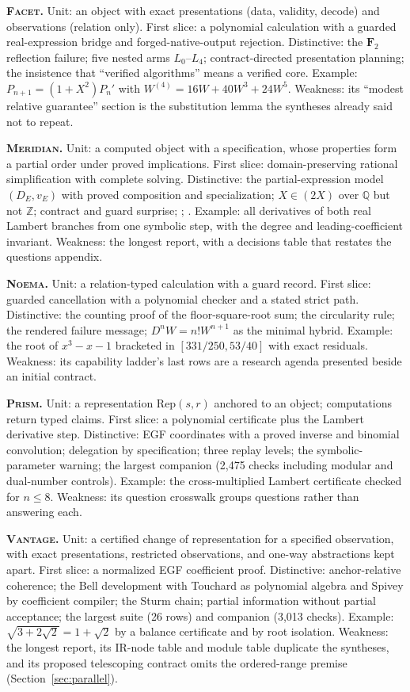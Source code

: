 \documentclass[11pt,a4paper]{article}
\newcommand{\code}[1]{\texttt{\detokenize{#1}}}
\newcommand{\Fc}{\textsc{Facet}}
\newcommand{\Md}{\textsc{Meridian}}
\newcommand{\Nm}{\textsc{Noema}}
\newcommand{\Pm}{\textsc{Prism}}
\newcommand{\Vt}{\textsc{Vantage}}
\newcommand{\Z}{\mathbb Z}
\newcommand{\Q}{\mathbb Q}
\theoremstyle{definition}
\begin{document}
\textbf{\Fc.} Unit: an object with exact presentations (data, validity, decode) and observations (relation only). First slice: a polynomial calculation with a guarded real-expression bridge and forged-native-output rejection. Distinctive: the $\mathbf F_2$ reflection failure; five nested arms $L_0$--$L_4$; contract-directed presentation planning; the insistence that ``verified algorithms'' means a verified core. Example: $P_{n+1}=(1+X^2)P_n'$ with $W^{(4)}=16W+40W^3+24W^5$. Weakness: its ``modest relative guarantee'' section is the substitution lemma the syntheses already said not to repeat.

\textbf{\Md.} Unit: a computed object with a specification, whose properties form a partial order under proved implications. First slice: domain-preserving rational simplification with complete solving. Distinctive: the partial-expression model $(D_E,v_E)$ with proved composition and specialization; $X\in(2X)$ over $\Q$ but not $\Z$; contract and guard surprise; \code{match_scalars}; \code{cbv}. Example: all derivatives of both real Lambert branches from one symbolic step, with the degree and leading-coefficient invariant. Weakness: the longest report, with a decisions table that restates the questions appendix.

\textbf{\Nm.} Unit: a relation-typed calculation with a guard record. First slice: guarded cancellation with a polynomial checker and a stated strict path. Distinctive: the counting proof of the floor-square-root sum; the circularity rule; the rendered failure message; $D^nW=n!W^{n+1}$ as the minimal hybrid. Example: the root of $x^3-x-1$ bracketed in $[331/250,53/40]$ with exact residuals. Weakness: its capability ladder's last rows are a research agenda presented beside an initial contract.

\textbf{\Pm.} Unit: a representation $\mathrm{Rep}(s,r)$ anchored to an object; computations return typed claims. First slice: a polynomial certificate plus the Lambert derivative step. Distinctive: EGF coordinates with a proved inverse and binomial convolution; delegation by specification; three replay levels; the symbolic-parameter warning; the largest companion (2,475 checks including modular and dual-number controls). Example: the cross-multiplied Lambert certificate checked for $n\le 8$. Weakness: its question crosswalk groups questions rather than answering each.

\textbf{\Vt.} Unit: a certified change of representation for a specified observation, with exact presentations, restricted observations, and one-way abstractions kept apart. First slice: a normalized EGF coefficient proof. Distinctive: anchor-relative coherence; the Bell development with Touchard as polynomial algebra and Spivey by coefficient compiler; the Sturm chain; partial information without partial acceptance; the largest suite (26 rows) and companion (3,013 checks). Example: $\sqrt{3+2\sqrt2}=1+\sqrt2$ by a balance certificate and by root isolation. Weakness: the longest report, its IR-node table and module table duplicate the syntheses, and its proposed telescoping contract omits the ordered-range premise (Section~\ref{sec:parallel}).
\end{document}
